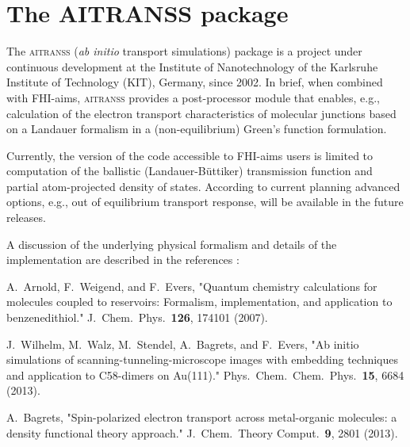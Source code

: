 \documentclass[12pt,a4paper,twoside,openany,titlepage,final]{book}
\begin{document}














%











\chapter[The AITRANSS package]{The {\LARGE AITRANSS} package}
\label{Ch:aitranss}

The \textsc{aitranss} ({\it ab initio} transport simulations) package is
a project under continuous development at the Institute of Nanotechnology
of the Karlsruhe Institute of Technology (KIT), Germany, since 2002. In
brief, when combined with FHI-aims, \textsc{aitranss} provides a
post-processor module that enables, e.g., calculation of the electron
transport characteristics of molecular junctions based on a Landauer
formalism in a (non-equilibrium) Green's function formulation.

Currently, the version of the code accessible to FHI-aims users is
limited to computation of the ballistic (Landauer-B\"uttiker) transmission
function and partial atom-projected density of states.
According to current planning advanced options, e.g., out of
equilibrium transport response, will be available in the future releases.

A discussion of the underlying physical formalism and details of the
implementation are described in the references \cite{Arnold2007,Wilhelm2013,Bagrets2013}:

\begin{center}
\parbox[c]{0.85\textwidth}
{\small
A.\ Arnold, F.\ Weigend, and F.\ Evers,
"Quantum chemistry calculations for molecules coupled to reservoirs:
Formalism, implementation, and application to benzenedithiol."
J.\ Chem.\ Phys.\ \textbf{126}, 174101 (2007).
}
\medskip

\parbox[c]{0.85\textwidth}
{\small
J.\ Wilhelm, M.\ Walz, M.\ Stendel, A.\ Bagrets, and F.\ Evers,
"Ab initio simulations of scanning-tunneling-microscope
images with embedding techniques and application to C58-dimers
on Au(111)." Phys.\ Chem.\ Chem.\ Phys.\ \textbf{15}, 6684 (2013).
}
\medskip

\parbox[c]{0.85\textwidth}
{\small
A.\ Bagrets, "Spin-polarized electron transport across metal-organic
molecules: a density functional theory approach."
J.\ Chem.\ Theory Comput.\ \textbf{9}, 2801 (2013).
}
\medskip

\end{center}
\end{document}
